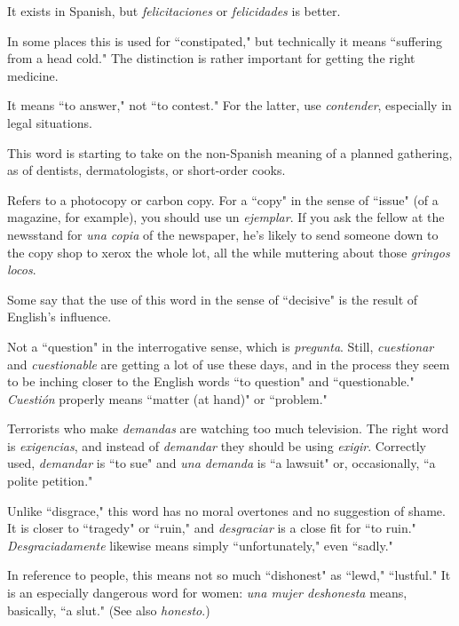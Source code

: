  It exists in Spanish, but \emph{felicitaciones}
or \emph{felicidades} is better.

 In some places this is used for ``constipated,"
but technically it means ``suffering from a head cold." The distinction
is rather important for getting the right medicine.

 It means ``to answer," not ``to contest." For the
latter, use \emph{contender}, especially in legal situations.

 This word is starting to take on the non-Spanish meaning of a planned gathering, as of dentists, dermatologists, or short-order cooks.

 Refers to a photocopy or carbon copy. For a ``copy" in
the sense of ``issue" (of a magazine, for example), you should use un
\emph{ejemplar}. If you ask the fellow at the newsstand for \emph{una copia} of the
newspaper, he's likely to send someone down to the copy shop to
xerox the whole lot, all the while muttering about those \emph{gringos
locos}.

 Some say that the use of this word in the sense of
``decisive" is the result of English's influence.

 Not a ``question" in the interrogative sense,
which is \emph{pregunta}. Still, \emph{cuestionar} and \emph{cuestionable} are getting a
lot of use these days, and in the process they seem to be inching closer
to the English words ``to question" and ``questionable." \emph{Cuestión} properly means ``matter (at hand)" or ``problem."

 Terrorists who make \emph{demandas} are watching
too much television. The right word is \emph{exigencias}, and instead of
\emph{demandar} they should be using \emph{exigir}. Correctly used, \emph{demandar} is
``to sue" and \emph{una demanda} is ``a lawsuit" or, occasionally, ``a polite
petition."

 Unlike ``disgrace," this word has no moral overtones and no suggestion of shame. It is closer to ``tragedy" or ``ruin,"
and \emph{desgraciar} is a close fit for ``to ruin." \emph{Desgraciadamente} likewise
means simply ``unfortunately," even ``sadly."

 In reference to people, this means not so
much ``dishonest" as ``lewd," ``lustful." It is an especially dangerous
word for women: \emph{una mujer deshonesta} means, basically, ``a slut."
(See also \emph{honesto}.)

